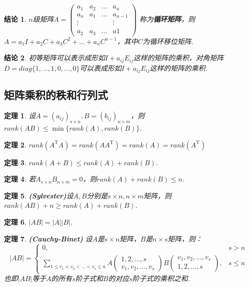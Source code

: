 \documentclass[UTF8]{article}
\newtheorem{thrm}{定理}[subsection]
\newtheorem{ccl}{结论}[subsection]
\begin{document}
\begin{ccl}
  $n$级矩阵$A=\begin{pmatrix} a_1 & a_2 & \ldots & a_n \\ a_n & a_1 & \ldots & a_{n-1} \\ \vdots & & & \vdots \\ a_2 & a_3 & \ldots &a1 \end{pmatrix}$
  称为\textbf{循环矩阵}，则$A=a_1I+a_2C+a_3C^2+\ldots+a_nC^{n-1}$，其中$C$为循环移位矩阵.
\end{ccl}
\begin{ccl}
  初等矩阵可以表示成形如$I+a_{ij}E_{ij}$这样的矩阵的乘积，对角矩阵$D=diag\{1,\ldots,1,0,\ldots,0\}$可以表成形如$I+a_{ij}E_{ij}$这样的矩阵的乘积.
\end{ccl}

\subsection{矩阵乘积的秩和行列式}
\begin{thrm}
  设$A=(a_{ij})_{s\times n},B=(b_{ij})_{n\times m}$，则$rank(AB)\le \min \{rank(A),rank(B)\}$.
\end{thrm}
\begin{thrm}
  $rank(A^\mathrm{T}A)=rank(AA^\mathrm{T})=rank(A)=rank(A^\mathrm{T})$
\end{thrm}
\begin{thrm}
  $rank(A+B)\le rank(A)+rank(B)$.
\end{thrm}
\begin{thrm}
  若$A_{s\times n}B_{n\times m}=0$，则$rank(A)+rank(B)\le n$.
\end{thrm}
\begin{thrm}
  \textbf{(Sylvester)}设$A,B$分别是$s\times n,n\times m$矩阵，则$rank(AB)+n\ge rank(A)+rank(B)$.
\end{thrm}
\begin{thrm}
  $|AB|=|A||B|$.
\end{thrm}
\begin{thrm}
  \textbf{(Cauchy-Binet) }设$A$是$s\times n$矩阵，$B$是$n\times s$矩阵，则：
  \[
  |AB|=
  \begin{cases}
    0,&s>n\\
    \sum\limits_{1\le v_1<v_2<\ldots<v_s\le n}A\begin{pmatrix}1,2,\ldots,s\\v_1,v_2,\ldots,v_s \end{pmatrix}
    B\begin{pmatrix}v_1,v_2,\ldots,v_s\\1,2,\ldots,s \end{pmatrix},&s\le n
  \end{cases}
  \]
  也即$|AB|$等于$A$的所有$s$阶子式和$B$的对应$s$阶子式的乘积之和.
\end{thrm}
\end{document}
